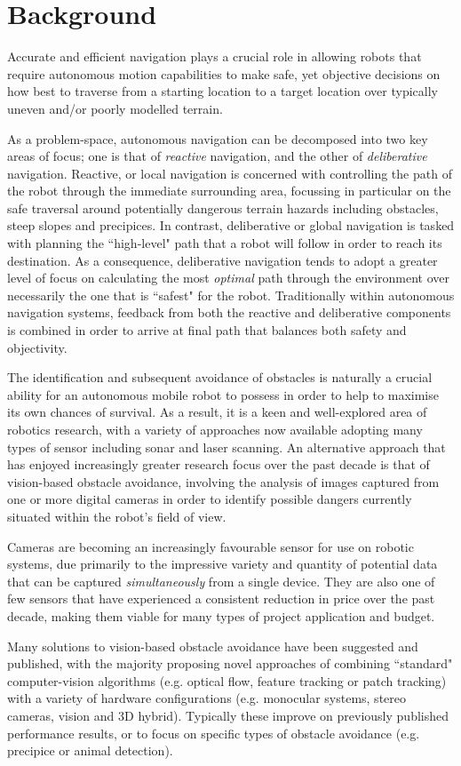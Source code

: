 \section{Background}

 Accurate and efficient navigation plays a crucial role in allowing robots that require autonomous motion capabilities to make safe, yet objective decisions on how best to traverse from a starting location to a target location over typically uneven and/or poorly modelled terrain. 

As a problem-space, autonomous navigation can be decomposed into two key areas of focus; one is that of \textit{reactive} navigation, and the other of \textit{deliberative} navigation. Reactive, or local navigation is concerned with controlling the path of the robot through the immediate surrounding area, focussing in particular on the safe traversal around potentially dangerous terrain hazards including obstacles, steep slopes and precipices. In contrast, deliberative or global navigation is tasked with planning the ``high-level" path that a robot will follow in order to reach its destination. As a consequence, deliberative navigation tends to adopt a greater level of focus on calculating the most \textit{optimal} path through the environment over necessarily the one that is ``safest" for the robot. Traditionally within autonomous navigation systems, feedback from both the reactive and deliberative components is combined in order to arrive at final path that balances both safety and objectivity. 

The identification and subsequent avoidance of obstacles is naturally a crucial ability for an autonomous mobile robot to possess in order to help to maximise its own chances of survival. As a result, it is a keen and well-explored area of robotics research, with a variety of approaches now available adopting many types of sensor including sonar and laser scanning. An alternative approach that has enjoyed increasingly greater research focus over the past decade is that of vision-based obstacle avoidance, involving the analysis of images captured from one or more digital cameras in order to identify possible dangers currently situated within the robot's field of view. 

Cameras are becoming an increasingly favourable sensor for use on robotic systems, due primarily to the impressive variety and quantity of potential data that can be captured \textit{simultaneously} from a single device. They are also one of few sensors that have experienced a consistent reduction in price over the past decade, making them viable for many types of project application and budget. 

Many solutions to vision-based obstacle avoidance have been suggested and published, with the majority proposing novel approaches of combining ``standard" computer-vision algorithms (e.g. optical flow, feature tracking or patch tracking) with a variety of hardware configurations (e.g. monocular systems, stereo cameras, vision and 3D hybrid). Typically these improve on previously published performance results, or to focus on specific types of obstacle avoidance (e.g. precipice or animal detection).
